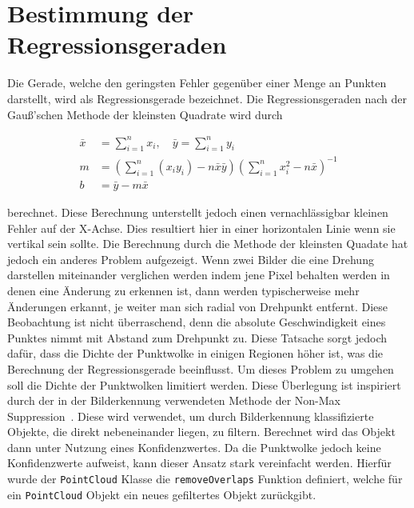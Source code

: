 \section{Bestimmung der Regressionsgeraden}\label{ch:bestimmung_regressionsgerade}

Die Gerade, welche den geringsten Fehler gegenüber einer Menge an Punkten darstellt, wird als Regressionsgerade bezeichnet.
Die Regressionsgeraden nach der Gau{\ss}'schen Methode der kleinsten Quadrate wird durch~\cite[S.~694]{Papula2016}

\begin{equation}
    \begin{split}
        \bar{x} &= \sum_{i=1}^n x_i, \quad \bar{y} = \sum_{i=1}^n y_i \\
        m &= \left(\sum_{i=1}^n (x_i y_i) - n \bar{x} \bar{y}\right) \left(\sum_{i=1}^n x_i^2 - n \bar{x}\right)^{-1} \\
        b &= \bar{y} - m\bar{x}
    \end{split}
    \label{eq:regression_gauss}
\end{equation}

berechnet.
Diese Berechnung unterstellt jedoch einen vernachlässigbar kleinen Fehler auf der X-Achse.
Dies resultiert hier in einer horizontalen Linie wenn sie vertikal sein sollte.
Die Berechnung durch die Methode der kleinsten Quadate hat jedoch ein anderes Problem aufgezeigt.
Wenn zwei Bilder die eine Drehung darstellen miteinander verglichen werden indem jene Pixel behalten werden in denen eine Änderung zu erkennen ist, dann werden typischerweise mehr Änderungen erkannt, je weiter man sich radial von Drehpunkt entfernt.
Diese Beobachtung ist nicht überraschend, denn die absolute Geschwindigkeit eines Punktes nimmt mit Abstand zum Drehpunkt zu.
Diese Tatsache sorgt jedoch dafür, dass die Dichte der Punktwolke in einigen Regionen höher ist, was die Berechnung der Regressionsgerade beeinflusst.
Um dieses Problem zu umgehen soll die Dichte der Punktwolken limitiert werden.
Diese Überlegung ist inspiriert durch der in der Bilderkennung verwendeten Methode der Non-Max Suppression~\cite[S.~486]{Geron2019}.
Diese wird verwendet, um durch Bilderkennung klassifizierte Objekte, die direkt nebeneinander liegen, zu filtern.
Berechnet wird das Objekt dann unter Nutzung eines Konfidenzwertes.
Da die Punktwolke jedoch keine Konfidenzwerte aufweist, kann dieser Ansatz stark vereinfacht werden.
Hierfür wurde der \lstinline{PointCloud} Klasse die \lstinline{removeOverlaps} Funktion definiert, welche für ein \lstinline{PointCloud} Objekt ein neues gefiltertes Objekt zurückgibt.

